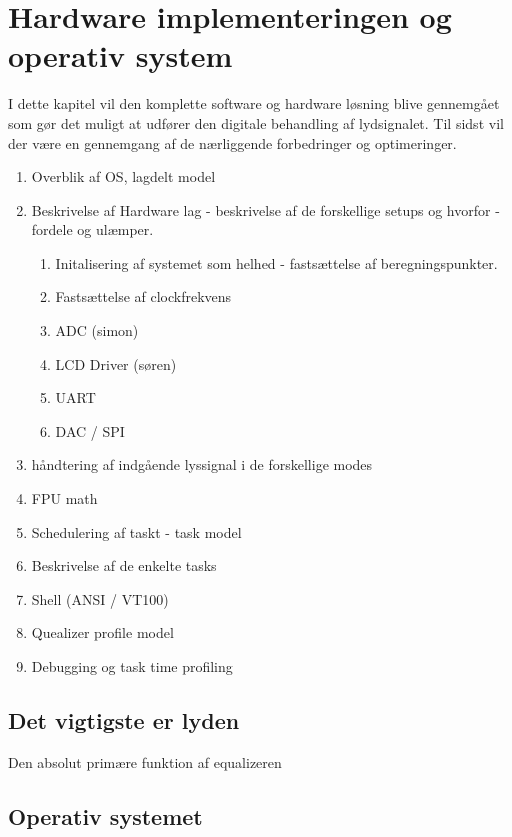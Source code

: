 \chapter{Hardware implementeringen og operativ system}\label{kap:hardware}

I dette kapitel vil den komplette software og hardware løsning blive gennemgået som gør det muligt at udfører den digitale behandling af lydsignalet.
Til sidst vil der være en gennemgang af de nærliggende forbedringer og optimeringer.


\begin{enumerate}
	\item Overblik af OS, lagdelt model
	\item Beskrivelse af Hardware lag - beskrivelse af de forskellige setups og hvorfor - fordele og ulæmper.
	\begin{enumerate}
		\item Initalisering af systemet som helhed - fastsættelse af beregningspunkter.
		\item Fastsættelse af clockfrekvens
		\item ADC (simon)
		\item LCD Driver (søren)
		\item UART
		\item DAC / SPI
	\end{enumerate}
	\item håndtering af indgående lyssignal i de forskellige modes
	\item FPU math
	\item Schedulering af taskt - task model 
	\item Beskrivelse af de enkelte tasks
	\item Shell (ANSI / VT100)
	\item Quealizer profile model
	\item Debugging og task time profiling
	
\end{enumerate}

\section{Det vigtigste er lyden}
Den absolut primære funktion af equalizeren   



\section{Operativ systemet}

